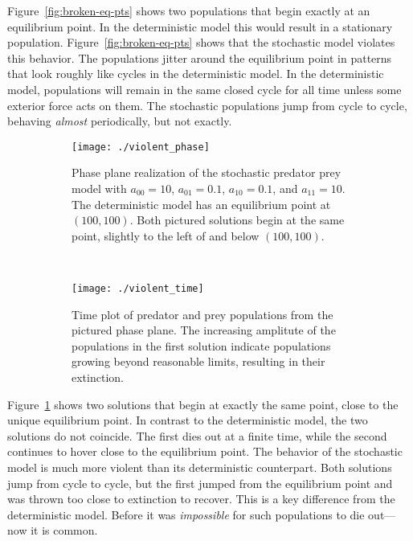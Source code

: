 \documentclass[12pt]{article}
\theoremstyle{definition}
\begin{document}
Figure~\ref{fig:broken-eq-pts} shows two populations that begin exactly at an
equilibrium point. In the deterministic model this would result in a stationary
population. Figure~\ref{fig:broken-eq-pts} shows that the stochastic model
violates this behavior. The populations jitter around the equilibrium point in
patterns that look roughly like cycles in the deterministic model. In the
deterministic model, populations will remain in the same closed cycle for all
time unless some exterior force acts on them. The stochastic populations jump
from cycle to cycle, behaving \emph{almost} periodically, but not exactly.

\begin{figure}[p]
    \centering
    \begin{subfigure}{.5\textwidth}
        \texttt{[image: ./violent\_phase]}
        \caption{Phase plane realization of the stochastic predator prey model
        with $a_{00} = 10$, $a_{01} = 0.1$, $a_{10} = 0.1$, and $a_{11} =
        10$. The deterministic model has an equilibrium point at $(100, 100)$.
        Both pictured solutions begin at the same point, slightly to the left
        of and below $(100, 100)$.}
    \end{subfigure}%
    ~~~
    \begin{subfigure}{.5\textwidth}
        \texttt{[image: ./violent\_time]}
        \caption{Time plot of predator and prey populations from the pictured
        phase plane. The increasing amplitute of the populations in the first
        solution indicate populations growing beyond reasonable limits,
        resulting in their extinction.}
    \end{subfigure}
    \caption{}
    \label{fig:violent-cycles}
\end{figure}

Figure~\ref{fig:violent-cycles} shows two solutions that begin at exactly the
same point, close to the unique equilibrium point. In contrast to the
deterministic model, the two solutions do not coincide. The first dies out at a
finite time, while the second continues to hover close to the equilibrium
point. The behavior of the stochastic model is much more violent than its
deterministic counterpart. Both solutions jump from cycle to cycle, but the
first jumped from the equilibrium point and was thrown too close to extinction
to recover. This is a key difference from the deterministic model. Before it
was \emph{impossible} for such populations to die out---now it is common.
\end{document}
